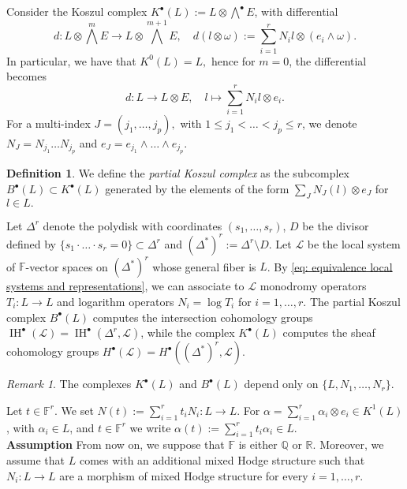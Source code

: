 \documentclass[a4paper,12 pt,titlepage,twoside]{book}
\newcommand{\numberset}{\mathbb}
\newcommand{\R}{\numberset{R}}
\newcommand{\Q}{\numberset{Q}}
\newcommand{\F}{\numberset{F}}
\newcommand{\ls}{\mathcal{L}}
\DeclareMathOperator{\IH}{IH}
\theoremstyle{plain}
\theoremstyle{theorem}
\theoremstyle{definition}
\newtheorem{defn}[thm]{Definition}
\theoremstyle{remark}
\newtheorem{oss}[thm]{Remark}
\begin{document}
	Consider the Koszul complex $K^\bullet(L) := L \otimes \bigwedge^\bullet E$, with differential $$d \colon L \otimes \bigwedge^m E \rightarrow L \otimes \bigwedge^{m+1} E, \quad d(l \otimes \omega) := \sum_{i=1}^r N_i l \otimes (e_i \wedge \omega).$$ In particular, we have that $K^0(L) = L,$ hence for $m=0$, the differential becomes $$d \colon L \rightarrow L \otimes E, \quad l \mapsto \sum_{i=1}^r N_il \otimes e_i.$$ For a multi-index $J = (j_1, \dots, j_p),$ with $1 \le j_1 < \dots < j_p \le r$, we denote $N_J = N_{j_1} \dots N_{j_p}$ and $e_J = e_{j_1} \wedge \dots \wedge e_{j_p}.$
	\begin{defn}
		We define the \emph{partial Koszul complex} as the subcomplex $B^\bullet(L) \subset K^\bullet(L)$ generated by the elements of the form $\sum_J N_J(l) \otimes e_J$ for $l \in L.$ 
	\end{defn}
	Let $\Delta^r$ denote the polydisk with coordinates $(s_1, \dots, s_r)$, $D$ be the divisor defined by $\{s_1 \cdot \dots \cdot s_r =0\} \subset \Delta^r$ and $(\Delta^*)^r := \Delta^r \setminus D.$ Let $\ls$ be the local system of $\F$-vector spaces on $(\Delta^*)^r$ whose general fiber is $L$. By \eqref{eq: equivalence local systems and representations}, we can associate to $\ls$ monodromy operators $T_i \colon L \rightarrow L$ and logarithm operators $N_i = \log T_i$ for $i=1, \dots, r.$
	The partial Koszul complex $B^\bullet(L)$ computes the intersection cohomology groups $\IH^\bullet(\mathcal{L}) = \IH^\bullet(\Delta^{r}, \mathcal{L})$, while the complex $K^\bullet(L)$ computes the sheaf cohomology groups $H^\bullet(\mathcal{L}) = H^\bullet((\Delta^*)^r, \mathcal{L}).$
	\begin{oss}
		The complexes $K^\bullet(L)$ and $B^\bullet(L)$ depend only on $\{L, N_1, \dots, N_r\}.$
	\end{oss}
	Let $t \in \F^r$. We set $N(t) := \sum_{i=1}^r t_iN_i \colon L \rightarrow L$. %
	For $\alpha = \sum_{i=1}^r \alpha_i \otimes e_i \in K^1(L)$, with $\alpha_i \in L$, and $t \in \F^r$ we write $\alpha(t) := \sum_{i=1}^r t_i \alpha_i \in L.$ \\
	\textbf{Assumption}\label{assumption mhs} From now on, we suppose that $\F$ is either $\Q$ or $\R.$ Moreover, we assume that $L$ comes with an additional mixed Hodge structure such that $N_i \colon L \rightarrow L$ are a morphism of mixed Hodge structure for every $i =1, \dots, r.$
	
\end{document}
